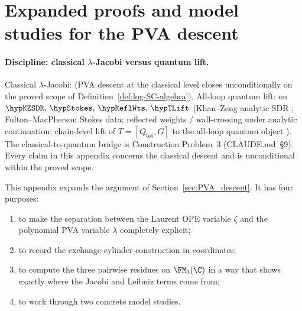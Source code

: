
\section{Expanded proofs and model studies for the PVA descent}
\label{app:pva-expanded-repaired}

\paragraph{Discipline: classical $\lambda$-Jacobi versus quantum lift.}
Classical $\lambda$-Jacobi: \ClaimStatusProvedHere{} (PVA descent at the
classical level closes unconditionally on the proved scope of
Definition~\ref{def:log-SC-algebra}). All-loop quantum lift:
\ClaimStatusConditional{} on
$\hypKZSDR,\,\hypStokes,\,\hypReflWts,\,\hypTLift$
(Khan--Zeng analytic SDR \cite{KZ25}; Fulton--MacPherson Stokes data;
reflected weights / wall-crossing under analytic continuation;
chain-level lift of $T = [Q_{\mathrm{tot}}, G]$ to the all-loop quantum
object \cite{Costello2011Renorm,CG17,LurieHA}). The classical-to-quantum
bridge is Construction Problem~3 (CLAUDE.md~\S9). Every claim in this
appendix concerns the classical descent and is unconditional within the
proved scope.

This appendix expands the argument of
Section~\ref{sec:PVA_descent}. It has four purposes:

\begin{enumerate}[label=\textup{(\alph*)}]
\item to make the separation between the Laurent OPE variable $\zeta$ and the
 polynomial PVA variable $\lambda$ completely explicit;
\item to record the exchange-cylinder construction in coordinates;
\item to compute the three pairwise residues on $\FM_3(\C)$ in a way that shows
 exactly where the Jacobi and Leibniz terms come from;
\item to work through two concrete model studies.
\end{enumerate}


